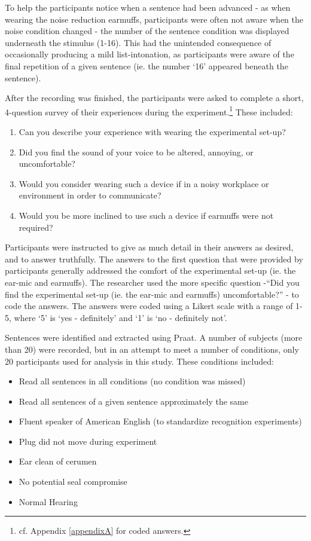 To help the participants notice when a sentence had been advanced - as when wearing the noise reduction earmuffs, participants were often not aware when the noise condition changed - the number of the sentence condition was displayed underneath the stimulus (1-16).  This had the unintended consequence of occasionally producing a mild list-intonation, as participants were aware of the final repetition of a given sentence (ie. the number `16' appeared beneath the sentence). 

After the recording was finished, the participants were asked to complete a short, 4-question survey of their experiences during the experiment.\footnote{cf. Appendix \ref{appendixA} for coded answers.}  These included:
\begin{enumerate}
  \item{Can you describe your experience with wearing the experimental set-up?}
  \item{Did you find the sound of your voice to be altered, annoying, or uncomfortable?}
  \item{Would you consider wearing such a device if in a noisy workplace or environment in order to communicate?}
  \item{Would you be more inclined to use such a device if earmuffs were not required?}
\end{enumerate}

Participants were instructed to give as much detail in their answers as desired, and to answer truthfully.  The answers to the first question that were provided by participants generally addressed the comfort of the experimental set-up (ie. the ear-mic and earmuffs).  The researcher used the more specific question -``Did you find the experimental set-up (ie. the ear-mic and earmuffs) uncomfortable?'' - to code the answers. The answers were coded using a Likert scale with a range of 1-5, where `5' is `yes - definitely' and `1' is `no - definitely not'.

Sentences were identified and extracted using Praat.  A number of subjects (more than 20) were recorded, but in an attempt to meet a number of conditions, only 20 participants used for analysis in this study.  These conditions included:
\begin{itemize}
\item{Read all sentences in all conditions (no condition was missed)}
\item{Read all sentences of a given sentence approximately the same}
\item{Fluent speaker of American English (to standardize recognition experiments)}
\item{Plug did not move during experiment}
\item{Ear clean of cerumen}
\item{No potential seal compromise}
\item{Normal Hearing}
\end{itemize}

